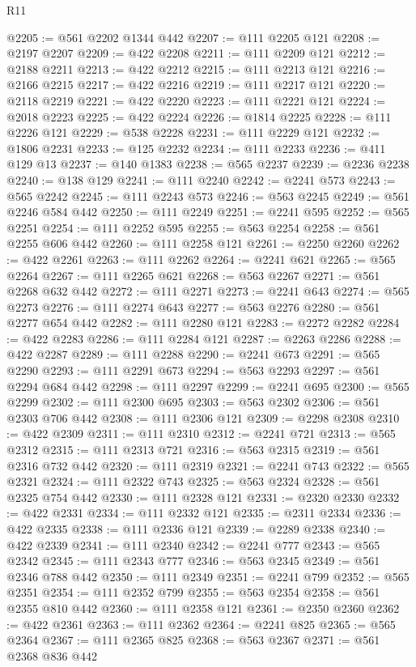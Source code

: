 \begin{lexlean}{R11}
\begin{coremodule}
{{{{{{{{{{{{{{{{{{{{{{{{{{{{{{{{{{{{{{{{{{{{{{{{{{{{{{{{{{{{{{{{{{{{{{{{{{{{{{{{{{@2205 := @561 @2202 @1344 @442
@2207 := @111 @2205 @121
@2208 := @2197 @2207
@2209 := @422 @2208
@2211 := @111 @2209 @121
@2212 := @2188 @2211
@2213 := @422 @2212
@2215 := @111 @2213 @121
@2216 := @2166 @2215
@2217 := @422 @2216
@2219 := @111 @2217 @121
@2220 := @2118 @2219
@2221 := @422 @2220
@2223 := @111 @2221 @121
@2224 := @2018 @2223
@2225 := @422 @2224
@2226 := @1814 @2225
@2228 := @111 @2226 @121
@2229 := @538 @2228
@2231 := @111 @2229 @121
@2232 := @1806 @2231
@2233 := @125 @2232
@2234 := @111 @2233
@2236 := @411 @129 @13
@2237 := @140 @1383
@2238 := @565 @2237
@2239 := @2236 @2238
@2240 := @138 @129
@2241 := @111 @2240
@2242 := @2241 @573
@2243 := @565 @2242
@2245 := @111 @2243 @573
@2246 := @563 @2245
@2249 := @561 @2246 @584 @442
@2250 := @111 @2249
@2251 := @2241 @595
@2252 := @565 @2251
@2254 := @111 @2252 @595
@2255 := @563 @2254
@2258 := @561 @2255 @606 @442
@2260 := @111 @2258 @121
@2261 := @2250 @2260
@2262 := @422 @2261
@2263 := @111 @2262
@2264 := @2241 @621
@2265 := @565 @2264
@2267 := @111 @2265 @621
@2268 := @563 @2267
@2271 := @561 @2268 @632 @442
@2272 := @111 @2271
@2273 := @2241 @643
@2274 := @565 @2273
@2276 := @111 @2274 @643
@2277 := @563 @2276
@2280 := @561 @2277 @654 @442
@2282 := @111 @2280 @121
@2283 := @2272 @2282
@2284 := @422 @2283
@2286 := @111 @2284 @121
@2287 := @2263 @2286
@2288 := @422 @2287
@2289 := @111 @2288
@2290 := @2241 @673
@2291 := @565 @2290
@2293 := @111 @2291 @673
@2294 := @563 @2293
@2297 := @561 @2294 @684 @442
@2298 := @111 @2297
@2299 := @2241 @695
@2300 := @565 @2299
@2302 := @111 @2300 @695
@2303 := @563 @2302
@2306 := @561 @2303 @706 @442
@2308 := @111 @2306 @121
@2309 := @2298 @2308
@2310 := @422 @2309
@2311 := @111 @2310
@2312 := @2241 @721
@2313 := @565 @2312
@2315 := @111 @2313 @721
@2316 := @563 @2315
@2319 := @561 @2316 @732 @442
@2320 := @111 @2319
@2321 := @2241 @743
@2322 := @565 @2321
@2324 := @111 @2322 @743
@2325 := @563 @2324
@2328 := @561 @2325 @754 @442
@2330 := @111 @2328 @121
@2331 := @2320 @2330
@2332 := @422 @2331
@2334 := @111 @2332 @121
@2335 := @2311 @2334
@2336 := @422 @2335
@2338 := @111 @2336 @121
@2339 := @2289 @2338
@2340 := @422 @2339
@2341 := @111 @2340
@2342 := @2241 @777
@2343 := @565 @2342
@2345 := @111 @2343 @777
@2346 := @563 @2345
@2349 := @561 @2346 @788 @442
@2350 := @111 @2349
@2351 := @2241 @799
@2352 := @565 @2351
@2354 := @111 @2352 @799
@2355 := @563 @2354
@2358 := @561 @2355 @810 @442
@2360 := @111 @2358 @121
@2361 := @2350 @2360
@2362 := @422 @2361
@2363 := @111 @2362
@2364 := @2241 @825
@2365 := @565 @2364
@2367 := @111 @2365 @825
@2368 := @563 @2367
@2371 := @561 @2368 @836 @442
}}}}}}}}}}}}}}}}}}}}}}}}}}}}}}}}}}}}}}}}}}}}}}}}}}}}}}}}}}}}}}}}}}}}}}}}}}}}}}}}}}
\end{coremodule}
\end{lexlean}
